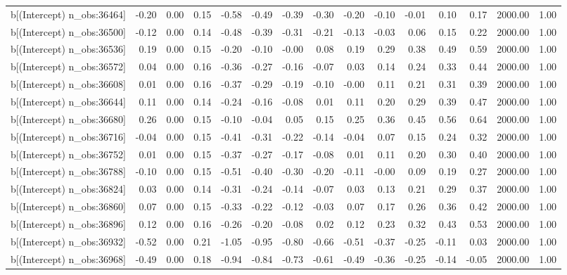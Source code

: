 \begin{table}[ht]
\begin{tabular}{rrrrrrrrrrrrrrr}
  b[(Intercept) n\_obs:36464] & -0.20 & 0.00 & 0.15 & -0.58 & -0.49 & -0.39 & -0.30 & -0.20 & -0.10 & -0.01 & 0.10 & 0.17 & 2000.00 & 1.00 \\ 
  b[(Intercept) n\_obs:36500] & -0.12 & 0.00 & 0.14 & -0.48 & -0.39 & -0.31 & -0.21 & -0.13 & -0.03 & 0.06 & 0.15 & 0.22 & 2000.00 & 1.00 \\ 
  b[(Intercept) n\_obs:36536] & 0.19 & 0.00 & 0.15 & -0.20 & -0.10 & -0.00 & 0.08 & 0.19 & 0.29 & 0.38 & 0.49 & 0.59 & 2000.00 & 1.00 \\ 
  b[(Intercept) n\_obs:36572] & 0.04 & 0.00 & 0.16 & -0.36 & -0.27 & -0.16 & -0.07 & 0.03 & 0.14 & 0.24 & 0.33 & 0.44 & 2000.00 & 1.00 \\ 
  b[(Intercept) n\_obs:36608] & 0.01 & 0.00 & 0.16 & -0.37 & -0.29 & -0.19 & -0.10 & -0.00 & 0.11 & 0.21 & 0.31 & 0.39 & 2000.00 & 1.00 \\ 
  b[(Intercept) n\_obs:36644] & 0.11 & 0.00 & 0.14 & -0.24 & -0.16 & -0.08 & 0.01 & 0.11 & 0.20 & 0.29 & 0.39 & 0.47 & 2000.00 & 1.00 \\ 
  b[(Intercept) n\_obs:36680] & 0.26 & 0.00 & 0.15 & -0.10 & -0.04 & 0.05 & 0.15 & 0.25 & 0.36 & 0.45 & 0.56 & 0.64 & 2000.00 & 1.00 \\ 
  b[(Intercept) n\_obs:36716] & -0.04 & 0.00 & 0.15 & -0.41 & -0.31 & -0.22 & -0.14 & -0.04 & 0.07 & 0.15 & 0.24 & 0.32 & 2000.00 & 1.00 \\ 
  b[(Intercept) n\_obs:36752] & 0.01 & 0.00 & 0.15 & -0.37 & -0.27 & -0.17 & -0.08 & 0.01 & 0.11 & 0.20 & 0.30 & 0.40 & 2000.00 & 1.00 \\ 
  b[(Intercept) n\_obs:36788] & -0.10 & 0.00 & 0.15 & -0.51 & -0.40 & -0.30 & -0.20 & -0.11 & -0.00 & 0.09 & 0.19 & 0.27 & 2000.00 & 1.00 \\ 
  b[(Intercept) n\_obs:36824] & 0.03 & 0.00 & 0.14 & -0.31 & -0.24 & -0.14 & -0.07 & 0.03 & 0.13 & 0.21 & 0.29 & 0.37 & 2000.00 & 1.00 \\ 
  b[(Intercept) n\_obs:36860] & 0.07 & 0.00 & 0.15 & -0.33 & -0.22 & -0.12 & -0.03 & 0.07 & 0.17 & 0.26 & 0.36 & 0.42 & 2000.00 & 1.00 \\ 
  b[(Intercept) n\_obs:36896] & 0.12 & 0.00 & 0.16 & -0.26 & -0.20 & -0.08 & 0.02 & 0.12 & 0.23 & 0.32 & 0.43 & 0.53 & 2000.00 & 1.00 \\ 
  b[(Intercept) n\_obs:36932] & -0.52 & 0.00 & 0.21 & -1.05 & -0.95 & -0.80 & -0.66 & -0.51 & -0.37 & -0.25 & -0.11 & 0.03 & 2000.00 & 1.00 \\ 
  b[(Intercept) n\_obs:36968] & -0.49 & 0.00 & 0.18 & -0.94 & -0.84 & -0.73 & -0.61 & -0.49 & -0.36 & -0.25 & -0.14 & -0.05 & 2000.00 & 1.00 \\ 

\end{tabular}
\end{table}
